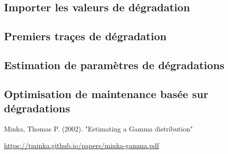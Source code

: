 \documentclass[10pt,a4paper]{article}
\begin{document}
\subsection{Importer les valeurs de dégradation}
\label{annexe:import_degrad}

\subsection{Premiers traçes de dégradation}
\label{annexe:premier_plot_degrad}

\subsection{Estimation de paramètres de dégradations}
\label{annexe:estim_degrad}

\subsection{Optimisation de maintenance basée sur dégradations}
\label{annexe:optim_degrad}


\begin{thebibliography}{9}
     Minka, Thomas P. (2002). "Estimating a Gamma distribution"

    \url{https://tminka.github.io/papers/minka-gamma.pdf}
\end{thebibliography}
\end{document}
